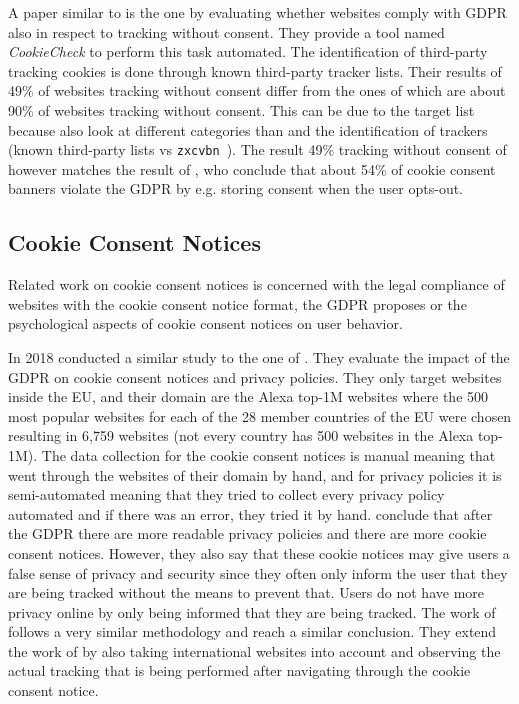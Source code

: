 A paper similar to  is the one by  evaluating whether websites comply
with GDPR also in respect to tracking without consent. They provide a tool named \emph{CookieCheck} to perform this task
automated. The identification of third-party tracking cookies is done through known third-party tracker lists. Their
results of 49\% of websites tracking without consent differ from the ones of \citeauthor{sanchez2019can} which are about
90\% of websites tracking without consent. This can be due to the target list because \citeauthor{trevisan20194} also
look at different categories than \citeauthor{sanchez2019can} and the identification of trackers (known third-party
lists vs \texttt{zxcvbn}~\cite{wheeler2016zxcvbn}). The result 49\% tracking without consent of
\citeauthor{trevisan20194} however matches the result of , who conclude that about 54\% of cookie consent
banners violate the GDPR by e.g. storing consent when the user opts-out.

\subsection{Cookie Consent Notices}

Related work on cookie consent notices is concerned with the legal compliance of websites with the cookie consent notice
format, the GDPR proposes or the psychological aspects of cookie consent notices on user behavior.

In 2018  conducted a similar study to the one of . They evaluate the impact of the
GDPR on cookie consent notices and privacy policies. They only target websites inside the EU, and their domain are the
Alexa top-1M websites where the 500 most popular websites for each of the 28 member countries of the EU were chosen resulting
in 6,759 websites (not every country has 500 websites in the Alexa top-1M). The data collection for the cookie consent notices is manual meaning that
\citeauthor{degeling2018we} went through the websites of their domain by hand, and for privacy policies it is
semi-automated meaning that they tried to collect every privacy policy automated and if there was an error, they tried
it by hand. \citeauthor{degeling2018we} conclude that after the GDPR there are more readable privacy policies
and there are more cookie consent notices. However, they also say that these cookie notices may give users a false sense
of privacy and security since they often only inform the user that they are being tracked without the means to prevent
that. Users do not have more privacy online by only being informed that they are being tracked. The work of
 follows a very similar methodology and reach a similar conclusion. They extend the work of
 by also taking international websites into account and observing the actual tracking that is being
performed after navigating through the cookie consent notice.

